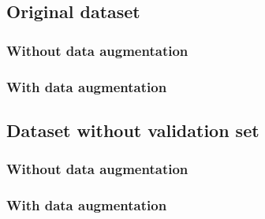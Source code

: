 \subsection{Original dataset}
\subsubsection{Without data augmentation}
\subsubsection{With data augmentation}
\subsection{Dataset without validation set}
\subsubsection{Without data augmentation}
\subsubsection{With data augmentation}